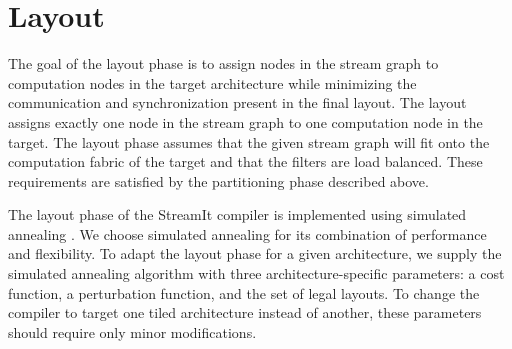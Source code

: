 \section{Layout}
\label{sec:layout}

The goal of the layout phase is to assign nodes in the stream graph to
computation nodes in the target architecture while minimizing the
communication and synchronization present in the final layout.  The
layout assigns exactly one node in the stream graph to one computation
node in the target.  The layout phase assumes that the given stream
graph will fit onto the computation fabric of the target and that the
filters are load balanced.  These requirements are satisfied by the
partitioning phase described above.



The layout phase of the StreamIt compiler is implemented using
simulated annealing \cite{simanneal}.  We choose simulated annealing
for its combination of performance and flexibility.  To adapt the
layout phase for a given architecture, we supply the simulated
annealing algorithm with three architecture-specific parameters: a
cost function, a perturbation function, and the set of legal layouts.
To change the compiler to target one tiled architecture instead of
another, these parameters should require only minor modifications.

